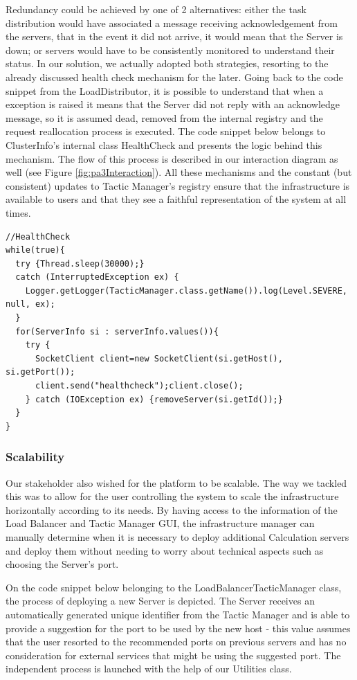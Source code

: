 \documentclass[12pt]{article}
\begin{document}
Redundancy could be achieved by one of 2 alternatives: 
either the task distribution would have associated a message receiving acknowledgement from the servers, that in the event it did not arrive, it would mean that 
the Server is down;
or servers would have to be consistently monitored to understand their status.
In our solution, we actually adopted both strategies, resorting to the already discussed health check mechanism for the later.
Going back to the code snippet from the LoadDistributor, it is possible to understand that when a exception is raised it means that the Server did not reply
with an acknowledge message, so it is assumed dead, removed from the internal registry and the request reallocation process is executed.
The code snippet below belongs to ClusterInfo's internal class HealthCheck and presents the logic behind this mechanism.
The flow of this process is described in our interaction diagram as well (see Figure \ref{fig:pa3Interaction}).
All these mechanisms and the constant (but consistent) updates to Tactic Manager's registry ensure that the infrastructure is available to users and that they 
see a faithful representation of the system at all times.

\begin{lstlisting}
//HealthCheck
while(true){
  try {Thread.sleep(30000);}
  catch (InterruptedException ex) {
    Logger.getLogger(TacticManager.class.getName()).log(Level.SEVERE, null, ex);
  }
  for(ServerInfo si : serverInfo.values()){
    try {
      SocketClient client=new SocketClient(si.getHost(), si.getPort());
      client.send("healthcheck");client.close();
    } catch (IOException ex) {removeServer(si.getId());}
  }
}
\end{lstlisting}

\subsubsection{Scalability} \label{scalability}

Our stakeholder also wished for the platform to be scalable.
The way we tackled this was to allow for the user controlling the system to scale the infrastructure horizontally according to its needs.
By having access to the information of the Load Balancer and Tactic Manager GUI, the infrastructure manager can manually determine when it is necessary to deploy
additional Calculation servers and deploy them without needing to worry about technical aspects such as choosing the Server's port.

On the code snippet below belonging to the LoadBalancerTacticManager class, the process of deploying a new Server is depicted.
The Server receives an automatically generated unique identifier from the Tactic Manager and is able to provide a suggestion for the port to be used by the new 
host - this value assumes that the user resorted to the recommended ports on previous servers and has no consideration for external services that might be using 
the suggested port.
The independent process is launched with the help of our Utilities class.
\end{document}
